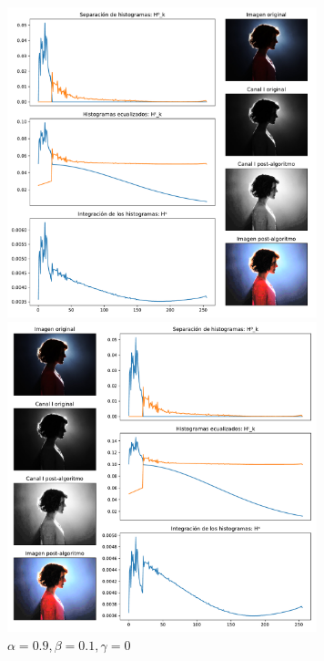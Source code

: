 \begin{figure}[H]
\begin{minipage}[c]{0.48\linewidth}
  \includegraphics[height=9cm]{imgs/wom-95-05-0.pdf}
  \caption{$\alpha = 0.95, \beta = 0.05, \gamma = 0$}
\end{minipage}
\hfill
\begin{minipage}[c]{0.48\linewidth}
  \includegraphics[height=9cm]{imgs/wom-9-1-0.pdf}
  \caption{$\alpha = 0.9, \beta = 0.1, \gamma = 0$}
\end{minipage}%
\end{figure}

